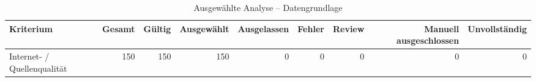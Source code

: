 \begin{table}[htbp]
\centering
\caption{Ausgewählte Analyse -- Datengrundlage}
\begin{tabular}{lrrrrrrrr}
\toprule
Kriterium & Gesamt & Gültig & Ausgewählt & Ausgelassen & Fehler & Review & Manuell ausgeschlossen & Unvollständig \\
\midrule
Internet- / Quellenqualität & 150 & 150 & 150 & 0 & 0 & 0 & 0 & 0 \\
\bottomrule
\end{tabular}
\end{table}
